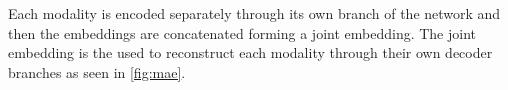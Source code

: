 Each modality is encoded separately through its own branch of the network and then the embeddings are concatenated forming a joint embedding. The joint embedding is the used to reconstruct each modality through their own decoder branches as seen in \autoref{fig:mae}.

%
%
%

\theendnotes